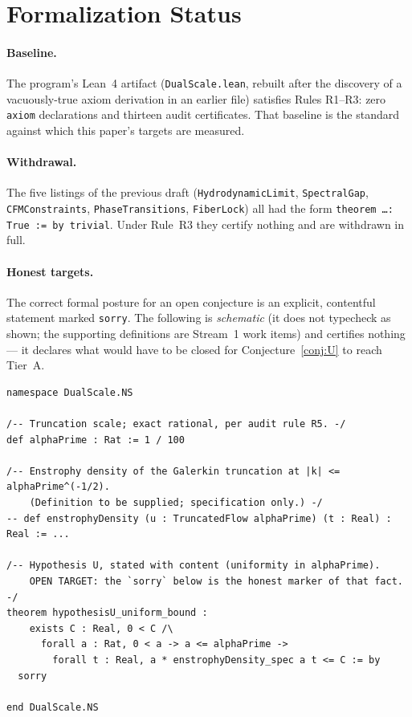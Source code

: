 \documentclass[11pt,a4paper]{article}
\theoremstyle{plain}
\theoremstyle{definition}
\theoremstyle{remark}
\begin{document}
\section{Formalization Status}\label{sec:lean}

\paragraph{Baseline.} The program's Lean~4 artifact
(\texttt{DualScale.lean}, rebuilt after the discovery of a vacuously-true
axiom derivation in an earlier file) satisfies Rules R1--R3: zero
\texttt{axiom} declarations and thirteen audit certificates. That baseline
is the standard against which this paper's targets are measured.

\paragraph{Withdrawal.} The five listings of the previous draft
(\texttt{HydrodynamicLimit}, \texttt{SpectralGap}, \texttt{CFMConstraints},
\texttt{PhaseTransitions}, \texttt{FiberLock}) all had the form
\texttt{theorem \ldots : True := by trivial}. Under Rule~R3 they certify
nothing and are withdrawn in full.

\paragraph{Honest targets.} The correct formal posture for an open
conjecture is an explicit, contentful statement marked \texttt{sorry}. The
following is \emph{schematic} (it does not typecheck as shown; the
supporting definitions are Stream~1 work items) and certifies nothing --- it
declares what would have to be closed for Conjecture~\ref{conj:U} to reach
Tier~A.

\begin{lstlisting}[caption={Formal target (OPEN). \texttt{sorry} = unproven; this listing is a specification, not a verification.}]
namespace DualScale.NS

/-- Truncation scale; exact rational, per audit rule R5. -/
def alphaPrime : Rat := 1 / 100

/-- Enstrophy density of the Galerkin truncation at |k| <= alphaPrime^(-1/2).
    (Definition to be supplied; specification only.) -/
-- def enstrophyDensity (u : TruncatedFlow alphaPrime) (t : Real) : Real := ...

/-- Hypothesis U, stated with content (uniformity in alphaPrime).
    OPEN TARGET: the `sorry` below is the honest marker of that fact. -/
theorem hypothesisU_uniform_bound :
    exists C : Real, 0 < C /\
      forall a : Rat, 0 < a -> a <= alphaPrime ->
        forall t : Real, a * enstrophyDensity_spec a t <= C := by
  sorry

end DualScale.NS
\end{lstlisting}
\end{document}
